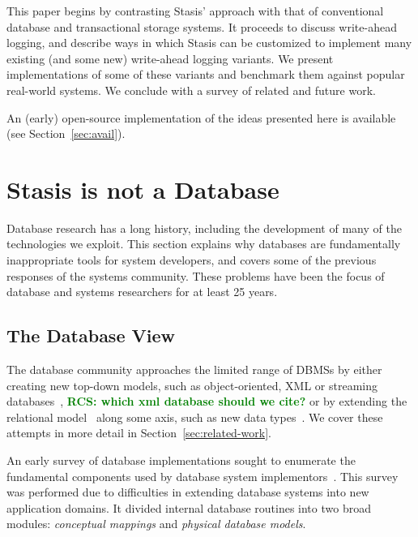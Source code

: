 \documentclass[letterpaper,twocolumn,10pt]{article}
\newcommand{\yad}{Stasis\xspace}
\newcommand{\yads}{Stasis'\xspace}
\newcommand{\eab}[1]{\textcolor{red}{\bf EAB: #1}}
\newcommand{\rcs}[1]{\textcolor{green}{\bf RCS: #1}}
\begin{document}

This paper begins by contrasting \yads approach with that of
conventional database and transactional storage systems.  It proceeds
to discuss write-ahead logging, and describe ways in which \yad can be
customized to implement many existing (and some new) write-ahead
logging variants.  We present implementations of some of these variants and
benchmark them against popular real-world systems.  We
conclude with a survey of related and future work.

An (early) open-source implementation of
the ideas presented here is available (see Section~\ref{sec:avail}).

\section{\yad is not a Database}
\label{sec:notDB}

Database research has a long history, including the development of
many of the technologies we exploit.  This section explains
why databases are fundamentally inappropriate tools for system
developers, and covers some of the previous responses of the systems
community.  These problems have been the focus of
database and systems researchers for at least 25 years.

\subsection{The Database View}

The database community approaches the limited range of DBMSs by either
creating new top-down models, such as object-oriented, XML or streaming databases~\cite{objectstore, streaming}, \rcs{which xml database should we cite?} 
or by extending the relational model~\cite{codd} along some axis, such
as new data types~\cite{newDBtypes}.  We cover these attempts in more detail in
Section~\ref{sec:related-work}.


An early survey of database implementations sought to enumerate the
fundamental components used by database system implementors~\cite{batoryConceptual,batoryPhysical}.  This
survey was performed due to difficulties in extending database systems
into new application domains.  It divided internal database
routines into two broad modules: {\em conceptual mappings} and {\em physical
database models}.
\end{document}
